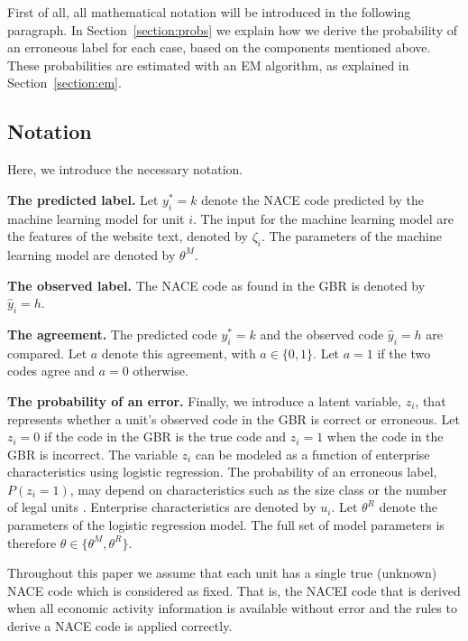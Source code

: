 \documentclass[12pt, a4paper, titlepage]{article}
\begin{document}
First of all, all mathematical notation will be introduced in the following paragraph. In Section~\ref{section:probs} we explain how we derive the probability of an erroneous label for each case, based on the components mentioned above. These probabilities are estimated with an EM algorithm, as explained in Section~\ref{section:em}.

							\subsection{Notation}
Here, we introduce the necessary notation.

\textbf{The predicted label.} Let $y^*_i = k$ denote the NACE code predicted by the machine learning model for unit $i$. The input for the machine learning model are the features of the website text, denoted by $\zeta_i$. The parameters of the machine learning model are denoted by $\theta^M$. 

\textbf{The observed label.} The NACE code as found in the GBR is denoted by $\hat{y}_i = h$. 

\textbf{The agreement.} The predicted code $y^*_i = k$ and the observed code  $\hat{y}_i = h$ are compared. Let $a$ denote this agreement, with $a \in \{0,1\}$. Let $a=1$ if the two codes agree and $a=0$ otherwise.

\textbf{The probability of an error.} Finally, we introduce a latent variable, $z_i$, that represents whether a unit's observed code in the GBR is correct or erroneous. Let $z_i = 0$ if the code in the GBR is the true code and $z_i = 1$ when the code in the GBR is incorrect. The variable $z_i$ can be modeled as a function of enterprise characteristics using logistic regression. The probability of an erroneous label, $P(z_i = 1)$, may depend on characteristics such as the size class or the number of legal units \citep{DeldenScholtusBurger}. Enterprise characteristics are denoted by  $u_i$. Let $\theta^R$ denote the parameters of the logistic regression model. The full set of model parameters is therefore $\theta \in \{ \theta^M, \theta^R\}$. 

Throughout this paper we assume that each unit has a single true (unknown) NACE code which is considered as fixed. That is, the NACEI code that is derived when all economic activity information is available without error and the rules to derive a NACE  code is applied correctly.
\end{document}
